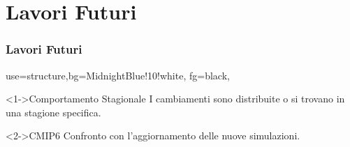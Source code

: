 \section{Lavori Futuri}
\begin{frame}
	\frametitle{Lavori Futuri}
	{
	 {use=structure,bg=MidnightBlue!10!white, fg=black,}
  \fontsize{14pt}{14}\selectfont

	
  \vspace{-0.3cm}	
	  
	\begin{block}<1->{Comportamento Stagionale}
    I cambiamenti sono distribuite o si trovano in una stagione specifica.
		
	\end{block}

	\vspace{-0.1cm}	

	\begin{block}<2->{CMIP6}
	Confronto con l'aggiornamento delle nuove simulazioni.
		
	\end{block}

	}
%	
\end{frame}
